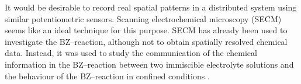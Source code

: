 \documentclass[3p, twocolumn]{elsarticle}
\begin{document}

It would be desirable to record real spatial patterns in a distributed system using similar potentiometric sensors.
Scanning electrochemical microscopy (SECM) seems like an ideal technique for this purpose. 
SECM has already been used to investigate the BZ--reaction, although not to obtain spatially resolved chemical data.
Instead, it was used to study the communication of the chemical information in the BZ--reaction between two immiscible electrolyte solutions \cite{} and the behaviour of the BZ--reaction in confined conditions \cite{}. 
\end{document}

